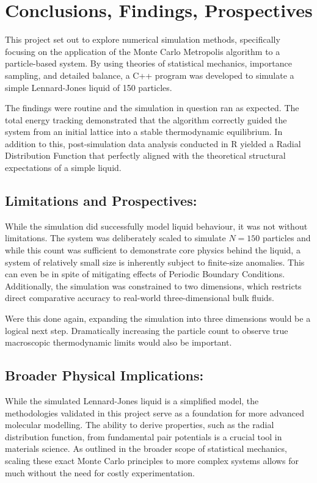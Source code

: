 \documentclass[11pt,a4paper]{article}
\begin{document}
\newpage
\section{Conclusions, Findings, Prospectives}
    This project set out to explore numerical simulation methods, specifically focusing on the application of the Monte Carlo Metropolis algorithm to a particle-based system.
    By using theories of statistical mechanics, importance sampling, and detailed balance, a C++ program was developed to simulate a simple Lennard-Jones liquid of 150 particles.
    
    The findings were routine and the simulation in question ran as expected.
    The total energy tracking demonstrated that the algorithm correctly guided the system from an initial lattice into a stable thermodynamic equilibrium.
    In addition to this, post-simulation data analysis conducted in R yielded a Radial Distribution Function that perfectly aligned with the theoretical structural expectations of a simple liquid.
    
    \subsection{Limitations and Prospectives:}
        While the simulation did successfully model liquid behaviour, it was not without limitations.
        The system was deliberately scaled to simulate $N=150$ particles and while this count was sufficient to demonstrate core physics behind the liquid, a system of relatively small size is inherently subject to finite-size anomalies.
        This can even be in spite of mitigating effects of Periodic Boundary Conditions.
        Additionally, the simulation was constrained to two dimensions, which restricts direct comparative accuracy to real-world three-dimensional bulk fluids.
    
        Were this done again, expanding the simulation into three dimensions would be a logical next step.
        Dramatically increasing the particle count to observe true macroscopic thermodynamic limits would also be important.

    \subsection{Broader Physical Implications:}
        While the simulated Lennard-Jones liquid is a simplified model, the methodologies validated in this project serve as a foundation for more advanced molecular modelling.
        The ability to derive properties, such as the radial distribution function, from fundamental pair potentials is a crucial tool in materials science.
        As outlined in the broader scope of statistical mechanics, scaling these exact Monte Carlo principles to more complex systems allows for much without the need for costly experimentation.
  
\end{document}
